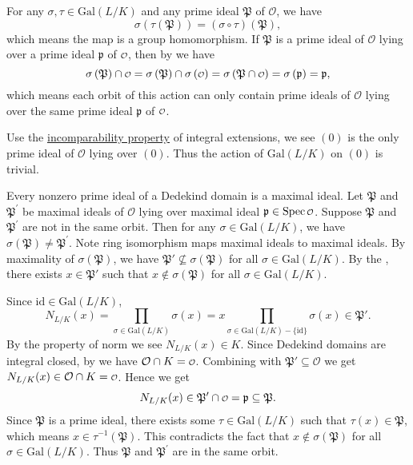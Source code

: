 \begin{prf}
For any $\sigma,\tau\in \mathrm{Gal}(L/K)$ and any prime ideal $\mathfrak{P}$ of $\mathcal{O}$, we have
\[
    \sigma\left(\tau\left(\mathfrak{P}\right)\right)=\left(\sigma\circ \tau\right)\left(\mathfrak{P}\right),
\]
which means the map is a group homomorphism. If $\mathfrak{P}$ is a prime ideal of $\mathcal{O}$ lying over a prime ideal $\mathfrak{p}$ of $\mathcalo$, then by  we have
\[
\sigma\left(\mathfrak{P}\right)\cap \mathcalo=\sigma\left(\mathfrak{P}\right)\cap \sigma\left(\mathcalo\right)=\sigma\left(\mathfrak{P}\cap \mathcalo\right)=\sigma\left(\mathfrak{p}\right)=\mathfrak{p},
\]
which means each orbit of this action can only contain prime ideals of $\mathcal{O}$ lying over the same prime ideal $\mathfrak{p}$ of $\mathcalo$.

Use the \hyperref[th:going_up_and_going_down_theorems]{incomparability property} of integral extensions, we see $(0)$ is the only prime ideal of $\mathcal{O}$ lying over $(0)$. Thus the action of $\mathrm{Gal}(L/K)$ on $(0)$ is trivial.

Every nonzero prime ideal of a Dedekind domain is a maximal ideal. Let $\mathfrak{P}$ and $\mathfrak{P}^\prime$ be maximal ideals of $\mathcal{O}$ lying over maximal ideal $\mathfrak{p}\in\spec \mathcalo$. Suppose $\mathfrak{P}$ and $\mathfrak{P}^\prime$ are not in the same orbit. Then for any $\sigma\in \mathrm{Gal}(L/K)$, we have $\sigma(\mathfrak{P})\ne \mathfrak{P}^\prime$. Note ring isomorphism maps maximal ideals to maximal ideals. By maximality of $\sigma(\mathfrak{P})$, we have $\mathfrak{P}'\not\subseteq \sigma(\mathfrak{P})$ for all $\sigma\in\mathrm{Gal}(L/K)$. By the , there exists $x\in \mathfrak{P}'$ such that $x\notin \sigma(\mathfrak{P})$ for all $\sigma\in\mathrm{Gal}(L/K)$. 

Since $\mathrm{id}\in \mathrm{Gal}(L/K)$,
\[
N_{L/K}(x)=\prod_{\sigma\in \mathrm{Gal}(L/K)}\sigma(x)=x \prod_{\sigma\in \mathrm{Gal}(L/K)-\{\mathrm{id}\}}\sigma(x)\in \mathfrak{P}'.
\]
By the property of norm we see $N_{L/K}(x) \in K$. Since Dedekind domains are integral closed, by  we have $\mathcal{O}\cap K=\mathcalo$. Combining with $\mathfrak{P}'\subseteq \mathcal{O}$ we get $N_{L/K}(x)\in \mathcal{O}\cap K=\mathcalo$. Hence we get 
\[
    N_{L/K}(x)\in \mathfrak{P}' \cap \mathcalo =\mathfrak{p}\subseteq \mathfrak{P}.
\]
Since $\mathfrak{P}$ is a prime ideal, there exists some $\tau\in \mathrm{Gal}(L/K)$ such that $\tau(x)\in \mathfrak{P}$, which means $x\in \tau^{-1}(\mathfrak{P})$. This contradicts the fact that $x\notin \sigma(\mathfrak{P})$ for all $\sigma\in\mathrm{Gal}(L/K)$. Thus $\mathfrak{P}$ and $\mathfrak{P}^\prime$ are in the same orbit.
\end{prf}

